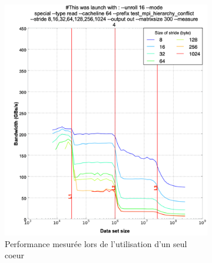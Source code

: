         \begin{figure}
        \centering
            \begin{subfigure}[b]{0.47\linewidth}
            \includegraphics[width=\linewidth]{images/dml_cache_1core.png}
            \caption{Performance mesurée lors de l'utilisation d'un seul coeur}
            \label{pic:dml_cache_1core}
            \end{subfigure}
        ~ %
            \begin{subfigure}[b]{0.47\linewidth}

\end{subfigure}
\end{figure}
